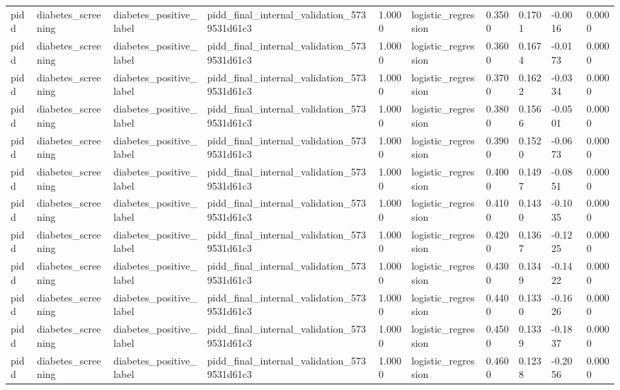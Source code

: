 \begin{tabular}{llllllllll}
pidd & diabetes\_screening & diabetes\_positive\_label & pidd\_final\_internal\_validation\_5739531d61c3 & 1.0000 & logistic\_regression & 0.3500 & 0.1701 & -0.0016 & 0.0000 \\
pidd & diabetes\_screening & diabetes\_positive\_label & pidd\_final\_internal\_validation\_5739531d61c3 & 1.0000 & logistic\_regression & 0.3600 & 0.1674 & -0.0173 & 0.0000 \\
pidd & diabetes\_screening & diabetes\_positive\_label & pidd\_final\_internal\_validation\_5739531d61c3 & 1.0000 & logistic\_regression & 0.3700 & 0.1622 & -0.0334 & 0.0000 \\
pidd & diabetes\_screening & diabetes\_positive\_label & pidd\_final\_internal\_validation\_5739531d61c3 & 1.0000 & logistic\_regression & 0.3800 & 0.1566 & -0.0501 & 0.0000 \\
pidd & diabetes\_screening & diabetes\_positive\_label & pidd\_final\_internal\_validation\_5739531d61c3 & 1.0000 & logistic\_regression & 0.3900 & 0.1520 & -0.0673 & 0.0000 \\
pidd & diabetes\_screening & diabetes\_positive\_label & pidd\_final\_internal\_validation\_5739531d61c3 & 1.0000 & logistic\_regression & 0.4000 & 0.1497 & -0.0851 & 0.0000 \\
pidd & diabetes\_screening & diabetes\_positive\_label & pidd\_final\_internal\_validation\_5739531d61c3 & 1.0000 & logistic\_regression & 0.4100 & 0.1430 & -0.1035 & 0.0000 \\
pidd & diabetes\_screening & diabetes\_positive\_label & pidd\_final\_internal\_validation\_5739531d61c3 & 1.0000 & logistic\_regression & 0.4200 & 0.1367 & -0.1225 & 0.0000 \\
pidd & diabetes\_screening & diabetes\_positive\_label & pidd\_final\_internal\_validation\_5739531d61c3 & 1.0000 & logistic\_regression & 0.4300 & 0.1349 & -0.1422 & 0.0000 \\
pidd & diabetes\_screening & diabetes\_positive\_label & pidd\_final\_internal\_validation\_5739531d61c3 & 1.0000 & logistic\_regression & 0.4400 & 0.1330 & -0.1626 & 0.0000 \\
pidd & diabetes\_screening & diabetes\_positive\_label & pidd\_final\_internal\_validation\_5739531d61c3 & 1.0000 & logistic\_regression & 0.4500 & 0.1339 & -0.1837 & 0.0000 \\
pidd & diabetes\_screening & diabetes\_positive\_label & pidd\_final\_internal\_validation\_5739531d61c3 & 1.0000 & logistic\_regression & 0.4600 & 0.1238 & -0.2056 & 0.0000 \\

\end{tabular}
